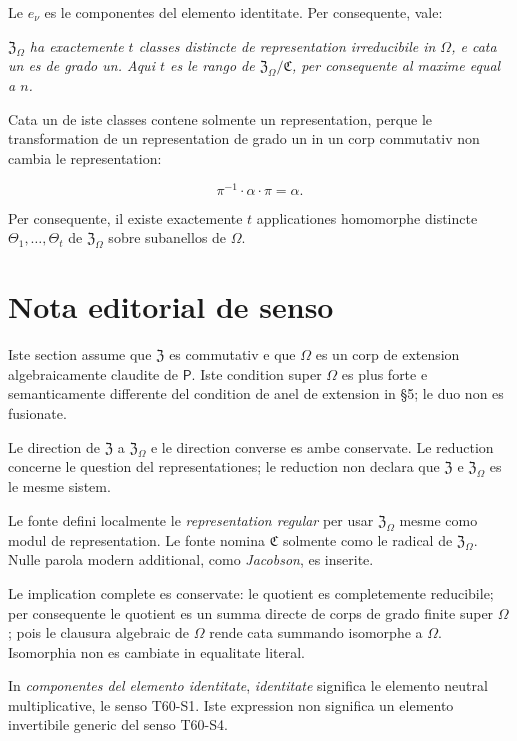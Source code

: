 \documentclass[11pt]{article}
\begin{document}
Le \(e_\nu\) es le componentes del elemento identitate. Per consequente, vale:

\emph{\(\mathfrak Z_\Omega\) ha exactemente \(t\) classes distincte de representation irreducibile in \(\Omega\), e cata un es de grado un. Aqui \(t\) es le rango de \(\mathfrak Z_\Omega/\mathfrak C\), per consequente al maxime equal a \(n\).}

Cata un de iste classes contene solmente un representation, perque le transformation de un representation de grado un in un corp commutativ non cambia le representation:

\[
\pi^{-1}\cdot\alpha\cdot\pi=\alpha.
\]

Per consequente, il existe exactemente \(t\) applicationes homomorphe distincte \(\Theta_1,\ldots,\Theta_t\) de \(\mathfrak Z_\Omega\) sobre subanellos de \(\Omega\).

\clearpage
\vspace*{8mm}
\section*{Nota editorial de senso}

Iste section assume que \(\mathfrak Z\) es commutativ e que \(\Omega\) es un corp de extension algebraicamente claudite de \(\mathsf P\). Iste condition super \(\Omega\) es plus forte e semanticamente differente del condition de anel de extension in §5; le duo non es fusionate.

Le direction de \(\mathfrak Z\) a \(\mathfrak Z_\Omega\) e le direction converse es ambe conservate. Le reduction concerne le question del representationes; le reduction non declara que \(\mathfrak Z\) e \(\mathfrak Z_\Omega\) es le mesme sistem.

Le fonte defini localmente le \emph{representation regular} per usar \(\mathfrak Z_\Omega\) mesme como modul de representation. Le fonte nomina \(\mathfrak C\) solmente como le radical de \(\mathfrak Z_\Omega\). Nulle parola modern additional, como \emph{Jacobson}, es inserite.

Le implication complete es conservate: le quotient es completemente reducibile; per consequente le quotient es un summa directe de corps de grado finite super \(\Omega\); pois le clausura algebraic de \(\Omega\) rende cata summando isomorphe a \(\Omega\). Isomorphia non es cambiate in equalitate literal.

In \emph{componentes del elemento identitate}, \emph{identitate} significa le elemento neutral multiplicative, le senso T60-S1. Iste expression non significa un elemento invertibile generic del senso T60-S4.
\end{document}
